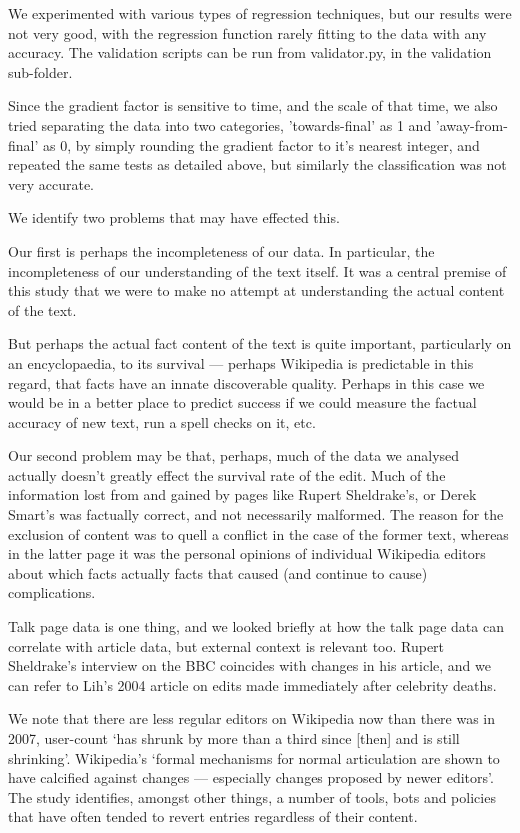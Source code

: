 We experimented with various types of regression techniques, but our
results were not very good, with the regression function rarely
fitting to the data with any accuracy. The validation scripts can be
run from validator.py, in the validation sub-folder.

Since the gradient factor is sensitive to time, and the scale of that
time, we also tried separating the data into two categories,
'towards-final' as 1 and 'away-from-final' as 0, by simply rounding
the gradient factor to it's nearest integer, and repeated the same
tests as detailed above, but similarly the classification was not very
accurate.

We identify two problems that may have effected this. 

Our first is perhaps the incompleteness of our data. In particular,
the incompleteness of our understanding of the text itself. It was a
central premise of this study that we were to make no attempt at
understanding the actual content of the text.

But perhaps the actual fact content of the text is quite important,
particularly on an encyclopaedia, to its survival --- perhaps Wikipedia
is predictable in this regard, that facts have an innate discoverable
quality. Perhaps in this case we would be in a better place to predict
success if we could measure the factual accuracy of new text, run a
spell checks on it, etc.

Our second problem may be that, perhaps, much of the data we analysed
actually doesn't greatly effect the survival rate of the edit. Much of
the information lost from and gained by pages like Rupert Sheldrake's,
or Derek Smart's was factually correct, and not necessarily
malformed. The reason for the exclusion of content was to quell a
conflict in the case of the former text, whereas in the latter page it
was the personal opinions of individual Wikipedia editors about which
facts actually  facts that caused (and continue to cause)
complications.

Talk page data is one thing, and we looked briefly at how the talk
page data can correlate with article data, but external context is
relevant too. Rupert Sheldrake's interview on the BBC coincides with
changes in his article, and we can refer to Lih's 2004 article on
edits made immediately after celebrity deaths.

We note that there are less regular editors on Wikipedia now than
there was in 2007, user-count `has shrunk by more than a third since
[then] and is still shrinking'.\cite{wiki-decline} Wikipedia's `formal
mechanisms for normal articulation are shown to have calcified against
changes –-- especially changes proposed by newer
editors'.\cite{wiki-decline-2} The study identifies, amongst other
things, a number of tools, bots and policies that have often tended to
revert entries regardless of their content.

